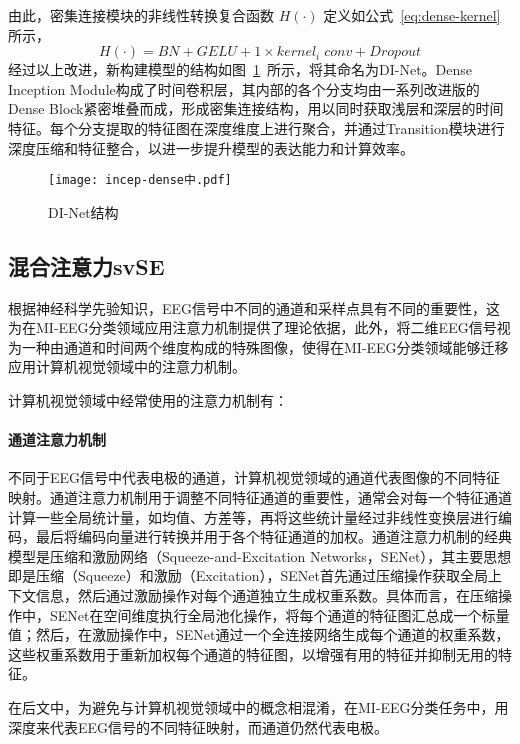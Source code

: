 由此，密集连接模块的非线性转换复合函数 \(H(·)\) 定义如公式~\ref{eq:dense-kernel}所示，
\begin{equation}\label{eq:dense-kernel}
    H(·) = BN + GELU + 1 \times kernel_i\;conv + Dropout 
\end{equation}
经过以上改进，新构建模型的结构如图~\ref{fig:incep-dense}~所示，将其命名为DI-Net。Dense Inception Module构成了时间卷积层，其内部的各个分支均由一系列改进版的Dense Block紧密堆叠而成，形成密集连接结构，用以同时获取浅层和深层的时间特征。每个分支提取的特征图在深度维度上进行聚合，并通过Transition模块进行深度压缩和特征整合，以进一步提升模型的表达能力和计算效率。
\begin{figure}
  \centering
  \texttt{[image: incep-dense中.pdf]}
  \caption{DI-Net结构}
  \label{fig:incep-dense}
\end{figure}

\subsection{混合注意力svSE}

根据神经科学先验知识，EEG信号中不同的通道和采样点具有不同的重要性，这为在MI-EEG分类领域应用注意力机制提供了理论依据，此外，将二维EEG信号视为一种由通道和时间两个维度构成的特殊图像，使得在MI-EEG分类领域能够迁移应用计算机视觉领域中的注意力机制。

计算机视觉领域中经常使用的注意力机制有：

\paragraph{通道注意力机制}
    
不同于EEG信号中代表电极的通道，计算机视觉领域的通道代表图像的不同特征映射。通道注意力机制用于调整不同特征通道的重要性，通常会对每一个特征通道计算一些全局统计量，如均值、方差等，再将这些统计量经过非线性变换层进行编码，最后将编码向量进行转换并用于各个特征通道的加权。通道注意力机制的经典模型是压缩和激励网络（Squeeze-and-Excitation Networks，SENet）\cite{8578843}，其主要思想即是压缩（Squeeze）和激励（Excitation），SENet首先通过压缩操作获取全局上下文信息，然后通过激励操作对每个通道独立生成权重系数。具体而言，在压缩操作中，SENet在空间维度执行全局池化操作，将每个通道的特征图汇总成一个标量值；然后，在激励操作中，SENet通过一个全连接网络生成每个通道的权重系数，这些权重系数用于重新加权每个通道的特征图，以增强有用的特征并抑制无用的特征。

在后文中，为避免与计算机视觉领域中的概念相混淆，在MI-EEG分类任务中，用深度来代表EEG信号的不同特征映射，而通道仍然代表电极。

